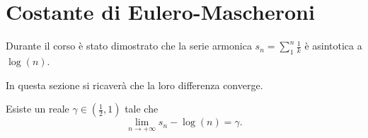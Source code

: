 \chapter{Costante di Eulero-Mascheroni}
Durante il corso è stato dimostrato che la serie armonica $s_n= \sum^n_1 \frac{1}{k}$ è asintotica a $ \log(n)$.

In questa sezione si ricaverà che la loro differenza converge.

\begin{Res} 
	Esiste un reale $ \gamma \in \left( \frac{1}{2},1 \right)$ tale che
	\begin{equation*}
		\lim \limits_{n \to+ \infty}s_n- \log(n)= 
		\gamma.
	\end{equation*}
\end{Res}
